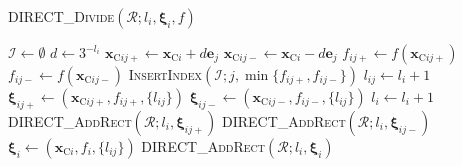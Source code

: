 ﻿\documentclass{jsarticle}
\begin{document}
\setcounter{algorithm}{0}
\begin{algorithm}[tbh]
\caption{\textsc{DIRECT\_Divide}$(\mathcal{R};l_{i},\bm{\xi}_{i},f)$}
\label{alg:direct_divide}
\begin{algorithmic}[1]
\State $\mathcal{I}\leftarrow\emptyset$
\State $d\leftarrow 3^{-l_{i}}$
    \State $\bm{x}_{\mathrm{C}ij+}\leftarrow\bm{x}_{\mathrm{C}i}+d\bm{e}_{j}$
    \State $\bm{x}_{\mathrm{C}ij-}\leftarrow\bm{x}_{\mathrm{C}i}-d\bm{e}_{j}$
    \State $f_{ij+}\leftarrow f(\bm{x}_{\mathrm{C}ij+})$
    \State $f_{ij-}\leftarrow f(\bm{x}_{\mathrm{C}ij-})$
    \State \textsc{InsertIndex}$(\mathcal{I};j,\min\{f_{ij+},f_{ij-}\})$
  \EndIf
\EndFor
{}
  \State $l_{ij}\leftarrow l_{i}+1$
  \State $\bm{\xi}_{ij+}\leftarrow(\bm{x}_{\mathrm{C}ij+},f_{ij+},\{l_{ij}\})$
  \State $\bm{\xi}_{ij-}\leftarrow(\bm{x}_{\mathrm{C}ij-},f_{ij-},\{l_{ij}\})$
    \State $l_{i}\leftarrow l_{i}+1$
  \EndIf
  \State \textsc{DIRECT\_AddRect}$(\mathcal{R};l_{i},\bm{\xi}_{ij+})$
  \State \textsc{DIRECT\_AddRect}$(\mathcal{R};l_{i},\bm{\xi}_{ij-})$
\EndFor
\State $\bm{\xi}_{i}\leftarrow(\bm{x}_{\mathrm{C}i},f_{i},\{l_{ij}\})$
\State \textsc{DIRECT\_AddRect}$(\mathcal{R};l_{i},\bm{\xi}_{i})$
\end{algorithmic}
\end{algorithm}
\end{document}
